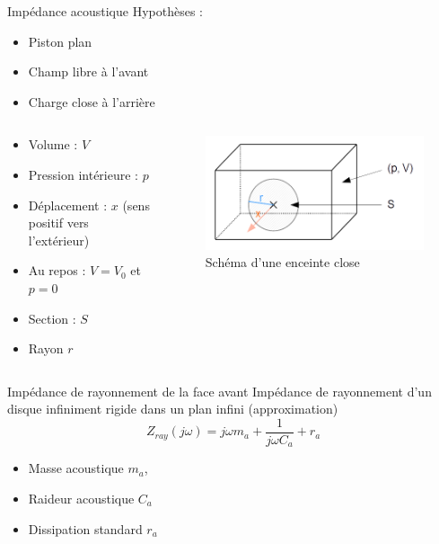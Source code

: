 \documentclass[aspectratio=169]{beamer}
\begin{document}
\begin{frame}{Impédance acoustique}
Hypothèses : 
\begin{itemize}
	\item Piston plan
	\item Champ libre à l'avant
	\item Charge close à l'arrière
\end{itemize}
\begin{columns}[t]\small
  \begin{column}{.6\textwidth}
  \begin{itemize}
  	\item Volume : $V$
  	\item Pression intérieure : $p$
  	\item Déplacement : $x$ (sens positif vers l'extérieur)
  	\item Au repos : $V=V_0$ et $p=0$
  	\item Section : $S$
  	\item Rayon $r$
  \end{itemize}
  \end{column}
  \begin{column}{.4\textwidth}
	\begin{figure}[!h]
	\includegraphics[width=1\textwidth]{figure/enceinte.png}
	\caption{Schéma d'une enceinte close}
	\end{figure}	
  \end{column}
\end{columns}
\end{frame}
\begin{frame}{Impédance de rayonnement de la face avant}
Impédance de rayonnement d'un disque infiniment rigide dans un plan infini (approximation)
\begin{equation}
	 Z_{ray}(j\omega) = j\omega m_a+\frac{1}{j\omega C_a}+r_a
\end{equation}
\begin{itemize}
	\item Masse acoustique $m_a$, 
	\item Raideur acoustique $C_a$
	\item Dissipation standard $r_a$
\end{itemize}
\end{frame}
\end{document}
